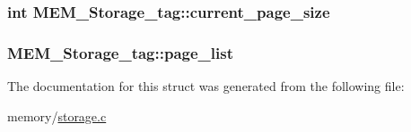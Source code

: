 \subsubsection[{current\+\_\+page\+\_\+size}]{\setlength{\rightskip}{0pt plus 5cm}int M\+E\+M\+\_\+\+Storage\+\_\+tag\+::current\+\_\+page\+\_\+size}\label{struct_m_e_m___storage__tag_ab81c5aee4e7f941cf9fa868e9f0ae654}
\hypertarget{struct_m_e_m___storage__tag_a83d397628eca89e2d89a1fa6088c3b9a}{}
\subsubsection[{page\+\_\+list}]{ M\+E\+M\+\_\+\+Storage\+\_\+tag\+::page\+\_\+list}\label{struct_m_e_m___storage__tag_a83d397628eca89e2d89a1fa6088c3b9a}


The documentation for this struct was generated from the following file\+:\begin{DoxyCompactItemize}
\item 
memory/\hyperlink{storage_8c}{storage.\+c}\end{DoxyCompactItemize}
